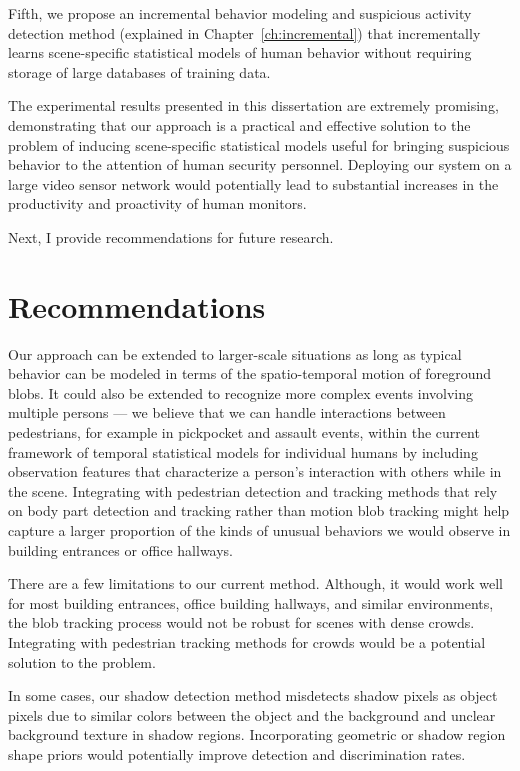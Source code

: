 Fifth, we propose an incremental behavior modeling and suspicious
activity detection method (explained in Chapter~\ref{ch:incremental})
that incrementally learns scene-specific statistical models of human
behavior without requiring storage of large databases of training
data.

The experimental results presented in this dissertation are extremely
promising, demonstrating that our approach is a practical and
effective solution to the problem of inducing scene-specific
statistical models useful for bringing suspicious behavior to the
attention of human security personnel. Deploying our system on a large
video sensor network would potentially lead to substantial increases
in the productivity and proactivity of human monitors.

Next, I provide recommendations for future research.

\section{Recommendations}

Our approach can be extended to larger-scale situations as long as
typical behavior can be modeled in terms of the spatio-temporal motion
of foreground blobs.  It could also be extended to recognize more
complex events involving multiple persons --- we believe that we can
handle interactions between pedestrians, for example in pickpocket and
assault events, within the current framework of temporal statistical
models for individual humans by including observation features that
characterize a person's interaction with others while in the scene.
Integrating with pedestrian detection and tracking methods that rely
on body part detection and tracking rather than motion blob tracking
might help capture a larger proportion of the kinds of unusual
behaviors we would observe in building entrances or office hallways.

There are a few limitations to our current method.  Although, it would
work well for most building entrances, office building hallways, and
similar environments, the blob tracking process would not be robust
for scenes with dense crowds. Integrating with pedestrian tracking
methods for crowds  would be a potential
solution to the problem.

In some cases, our shadow detection method misdetects shadow pixels as
object pixels due to similar colors between the object and the
background and unclear background texture in shadow
regions. Incorporating geometric or shadow region shape priors would
potentially improve detection and discrimination rates.

